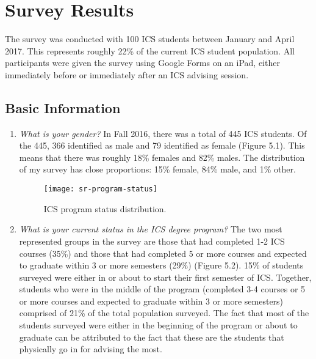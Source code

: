 \chapter{Survey Results}
\label{survey-results}

The survey was conducted with 100 ICS students between January and April 2017. This represents roughly 22\% of the current ICS student population. All participants were given the survey using Google Forms on an iPad, either immediately before or immediately after an ICS advising session. 

\section{Basic Information}
\begin{enumerate}
\begin{figure}[h]
\centering
\texttt{[image: sr-gender]}
\caption{Gender distribution.}
\end{figure}
\item \textit{What is your gender?}
In Fall 2016, there was a total of 445 ICS students. Of the 445, 366 identified as male and 79 identified as female (Figure 5.1). This means that there was roughly 18\% females and 82\% males. The distribution of my survey has close proportions: 15\% female, 84\% male, and 1\% other. 
\begin{figure}[h]
\centering
\texttt{[image: sr-program-status]}
\caption{ICS program status distribution.}
\end{figure}
\item \textit{What is your current status in the ICS degree program?}
The two most represented groups in the survey are those that had completed 1-2 ICS courses (35\%) and those that had completed 5 or more courses and expected to graduate within 3 or more semesters (29\%) (Figure 5.2). 15\% of students surveyed were either in or about to start their first semester of ICS. Together, students who were in the middle of the program (completed 3-4 courses or 5 or more courses and expected to graduate within 3 or more semesters) comprised of 21\% of the total population surveyed. The fact that most of the students surveyed were either in the beginning of the program or about to graduate can be attributed to the fact that these are the students that physically go in for advising the most. 
\end{enumerate}

